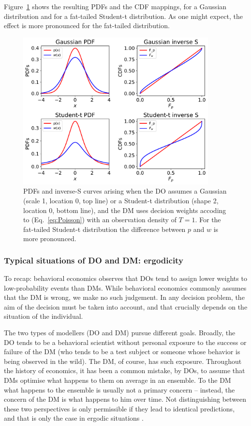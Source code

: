 \documentclass[a4paper, 12pt]{article}
\newcommand{\eref}[1]{(Eq.~\ref{eq:#1})}
\newcommand{\flabel}[1]{\label{fig:#1}}
\newcommand{\Fref}[1]{Figure~\ref{fig:#1}}
\begin{document}
\Fref{square_root_error} shows the resulting PDFs and the CDF mappings, for a Gaussian distribution and for a fat-tailed Student-t distribution. As one might expect, the effect is more pronounced for the fat-tailed distribution.
\begin{figure}[htb]
\centering
\includegraphics[width=0.9\textwidth]{./figs/square_root_error.pdf}
\caption{PDFs and inverse-S curves arising when the DO assumes a Gaussian (scale 1, location 0, top line) or a Student-t distribution (shape 2, location 0, bottom line), and the DM uses decision weights accoding to \eref{Poisson} with an observation density of $T=1$. For the fat-tailed Student-t distribution the difference between $p$ and $w$ is more pronounced.}
\flabel{square_root_error}
\end{figure}

\FloatBarrier
\subsubsection{Typical situations of DO and DM: ergodicity}
To recap: behavioral economics observes that DOs tend to assign lower weights to low-probability events than DMs.
While behavioral economics commonly assumes that the DM is wrong, we make no such judgement. In any decision problem, the aim of the decision must be taken into account, and that crucially depends on the situation of the individual. 

The two types of modellers (DO and DM) pursue different goals. Broadly, the DO tends to be a behavioral scientist without personal exposure to the success or failure of the DM (who tends to be a test subject or someone whose behavior is being observed in the wild). The DM, of course, has such exposure. Throughout the history of economics, it has been a common mistake, by DOs, to assume that DMs optimise what happens to them on average in an ensemble. To the DM what happens to the ensemble is usually not a primary concern -- instead, the concern of the DM is what happens to him over time. Not distinguishing between these two perspectives is only permissible if they lead to identical predictions, and that is only the case in ergodic situations \citep{Peters2019b}. 
\end{document}

